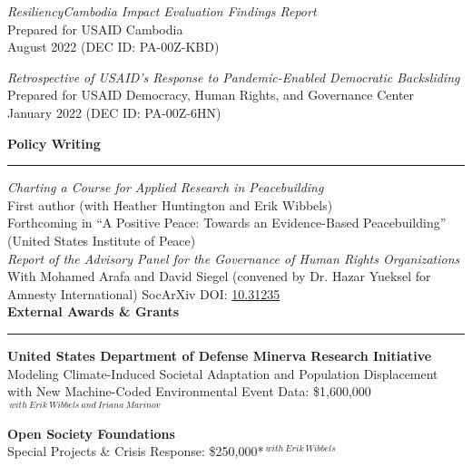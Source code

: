 \documentclass[11pt]{article}
\begin{document}
{\sl ResiliencyCambodia Impact Evaluation Findings Report}\\
Prepared for USAID Cambodia\\
August 2022 (DEC ID: PA-00Z-KBD)

{\sl  Retrospective of USAID’s Response to Pandemic-Enabled Democratic Backsliding}\\
Prepared for USAID Democracy, Human Rights, and Governance Center\\
January 2022 (DEC ID: PA-00Z-6HN)

\textbf{\large Policy Writing}\\
\rule[3mm]{\textwidth}{.2pt}
{\sl Charting a Course for Applied Research in Peacebuilding}\\
First author (with Heather Huntington and Erik Wibbels)\\
Forthcoming in ``A Positive Peace: Towards an Evidence-Based Peacebuilding'' (United States Institute of Peace)\\

{\sl Report of the Advisory Panel for the Governance of Human Rights Organizations}\\
With Mohamed Arafa and David Siegel (convened by Dr. Hazar Yueksel for Amnesty International) SocArXiv DOI: \href{https://doi.org/10.31235/osf.io/7devb}{10.31235}\\



\textbf{\large External Awards \& Grants}\\
\rule[3mm]{\textwidth}{.2pt}

\textbf{United States Department of Defense Minerva Research Initiative}\\
\hspace{1em} Modeling Climate-Induced Societal Adaptation and Population Displacement with New Machine-Coded Environmental Event Data: \$1,600,000$^{\ with\ Erik\ Wibbels\ and\ Iriana\ Marinov}$

\textbf{Open Society Foundations}\\
\hspace{1em} Special Projects \& Crisis Response: \$250,000*$^{\ with\ Erik\ Wibbels}$
\bigskip
\end{document}
